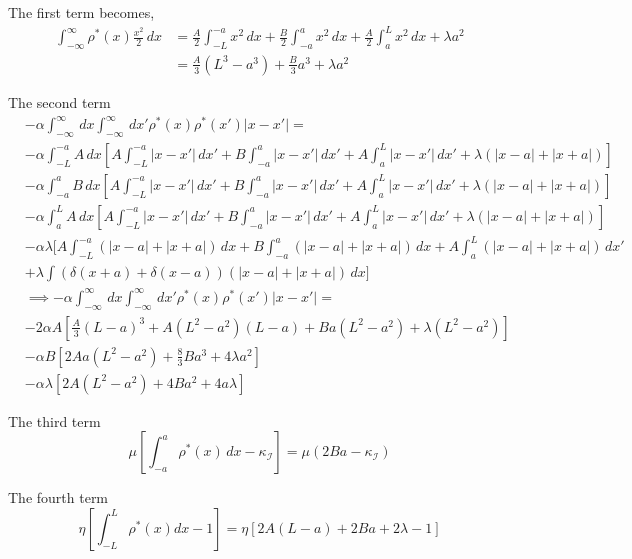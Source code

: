 \documentclass[11pt]{article}
\begin{document}
The first term becomes,
\begin{align}
\int_{-\infty}^\infty\rho^*(x)\frac{x^2}{2}\,dx & = \frac{A}{2}\int_{-L}^{-a}x^2\,dx+\frac{B}{2}\int_{-a}^ax^2\,dx+\frac{A}{2}\int_{a}^{L}x^2\,dx+\lambda a^2\nonumber\\
& = \frac{A}{3}(L^3-a^3)+\frac{B}{3}a^3 +\lambda a^2 \label{e1}
\end{align}

The second term
\begin{align}
&-\alpha\int_{-\infty}^\infty\,dx\int_{-\infty}^\infty\,dx'\rho^*(x)\rho^*(x')|x-x'|=\nonumber\\
&-\alpha\int_{-L}^{-a}A\,dx\left[A\int_{-L}^{-a}|x-x'|\,dx'+B\int_{-a}^a|x-x'|\,dx'+A\int_{a}^{L}|x-x'|\,dx'+\lambda\left(|x-a|+|x+a|\right)\right]\nonumber\\
&-\alpha\int_{-a}^{a}B\,dx\left[A\int_{-L}^{-a}|x-x'|\,dx'+B\int_{-a}^a|x-x'|\,dx'+A\int_{a}^{L}|x-x'|\,dx'+\lambda\left(|x-a|+|x+a|\right)\right]\nonumber\\
&-\alpha\int_{a}^{L}A\,dx\left[A\int_{-L}^{-a}|x-x'|\,dx'+B\int_{-a}^a|x-x'|\,dx'+A\int_{a}^{L}|x-x'|\,dx'+\lambda\left(|x-a|+|x+a|\right)\right]\nonumber\\
&-\alpha\lambda[A\int_{-L}^{-a}\left(|x-a|+|x+a|\right)\,dx+B\int_{-a}^a\left(|x-a|+|x+a|\right)\,dx+A\int_{a}^{L}\left(|x-a|+|x+a|\right)\,dx'\nonumber\\
&+\lambda\int(\delta(x+a)+\delta(x-a))\left(|x-a|+|x+a|\right)\,dx]\nonumber\\
&\implies -\alpha\int_{-\infty}^\infty\,dx\int_{-\infty}^\infty\,dx'\rho^*(x)\rho^*(x')|x-x'|=\nonumber\\
&-2\alpha A\left[\frac{A}{3}(L-a)^3+A(L^2-a^2)(L-a)+Ba(L^2-a^2)+\lambda(L^2-a^2)\right]\nonumber\\
&-\alpha B\left[2Aa(L^2-a^2)+\frac{8}{3}Ba^3+4\lambda a^2\right]\nonumber\\
&-\alpha\lambda\left[2A(L^2-a^2)+4Ba^2+4a\lambda\right]\label{e2}
\end{align}

The third term
\begin{equation}
\mu\left[\int_{-a}^a\rho^*(x)\,dx-\kappa_\mathcal{I}\right]=\mu\left(2Ba-\kappa_\mathcal{I}\right)\label{e3}
\end{equation}

The fourth term
\begin{equation}
\eta\left[\int_{-L}^{L}\rho^*(x)dx-1\right]=\eta\left[2A(L-a)+2Ba+2\lambda-1\right]\label{e4}
\end{equation}
\end{document}
